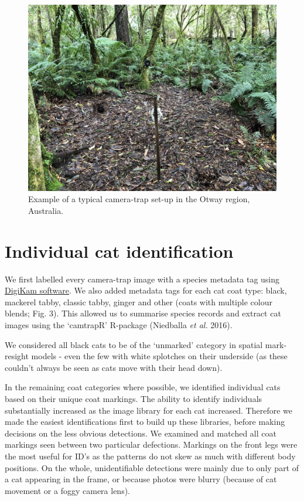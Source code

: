\documentclass[11pt,a4paper,titlepage,twoside,openright]{style/unimelbthesis}
\begin{document}
\begin{mainmatter}
\(~\)

\(~\)

\(~\)
\begin{figure}

{\centering \includegraphics[width=1\linewidth]{figure/camtrap1} 

}

\caption{Example of a typical camera-trap set-up in the Otway region, Australia.}\label{fig:density-cam-photo}
\end{figure}
\newpage

\hypertarget{density-app-id}{%
\section{Individual cat identification}\label{density-app-id}}

We first labelled every camera-trap image with a species metadata tag using \href{https://www.digikam.org}{DigiKam software}. We also added metadata tags for each cat coat type: black, mackerel tabby, classic tabby, ginger and other (coats with multiple colour blends; Fig. 3). This allowed us to summarise species records and extract cat images using the `camtrapR' R-package (Niedballa \emph{et al.} 2016).

We considered all black cats to be of the `unmarked' category in spatial mark-resight models - even the few with white splotches on their underside (as these couldn't always be seen as cats move with their head down).

In the remaining coat categories where possible, we identified individual cats based on their unique coat markings. The ability to identify individuals substantially increased as the image library for each cat increased. Therefore we made the easiest identifications first to build up these libraries, before making decisions on the less obvious detections. We examined and matched all coat markings seen between two particular defections. Markings on the front legs were the most useful for ID's as the patterns do not skew as much with different body positions. On the whole, unidentifiable detections were mainly due to only part of a cat appearing in the frame, or because photos were blurry (because of cat movement or a foggy camera lens).


\end{mainmatter}
\end{document}
